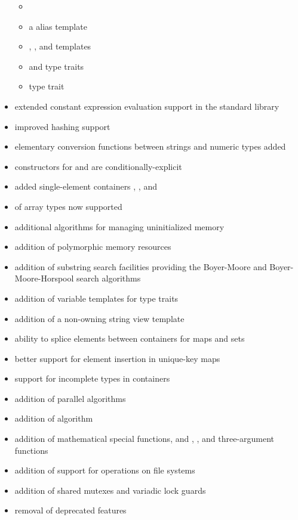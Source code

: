 \begin{itemize}
\begin{itemize}
  \item {}
  \item a  alias template
  \item {}, , and  templates
  \item {} and  type traits
  \item {} type trait
\end{itemize}
\item extended constant expression evaluation support in the standard library
\item improved hashing support
\item elementary conversion functions between strings and numeric types added
\item constructors for  and  are conditionally-explicit
\item added single-element containers , , and 
\item {} of array types now supported
\item additional algorithms for managing uninitialized memory
\item addition of polymorphic memory resources
\item addition of substring search facilities providing the Boyer-Moore and Boyer-Moore-Horspool search algorithms
\item addition of variable templates for type traits
\item addition of a non-owning string view template
\item ability to splice elements between containers for maps and sets
\item better support for element insertion in unique-key maps
\item support for incomplete types in containers
\item addition of parallel algorithms
\item addition of  algorithm
\item addition of mathematical special functions, and , , and three-argument  functions
\item addition of support for operations on file systems
\item addition of shared mutexes and variadic lock guards
\item removal of deprecated features
\end{itemize}
